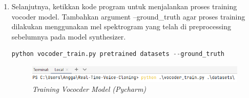 \begin{enumerate}
\begin{lstlisting}[language=Python, caption=Vocoder Train (Pycharm)]
\end{lstlisting}

\item Selanjutnya, ketikkan kode program untuk menjalankan proses training vocoder model. Tambahkan argument --ground\_truth agar proses training dilakukan menggunakan mel spektrogram yang telah di preprocessing sebelumnya pada model synthesizer.

\begin{lstlisting}[language=Python, caption=Training Vococder Model (Pycharm)]
python vocoder_train.py pretrained datasets --ground_truth
\end{lstlisting}

\begin{figure}[H]
    \centering
    \includegraphics[scale=0.55]{figures/dataset7}
    \caption{\textit{Training Vococder Model (Pycharm)}}
    \label{dataset7}
\end{figure}

\end{enumerate}

